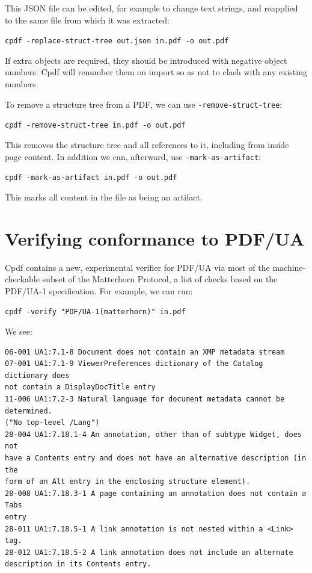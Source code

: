 \documentclass{book}
\begin{document}
This JSON file can be edited, for example to change text strings, and reapplied to the same file from which it was extracted:

  \begin{framed}
    \noindent\small\verb!cpdf -replace-struct-tree out.json in.pdf -o out.pdf!
  \end{framed}

\noindent If extra objects are required, they should be introduced with negative object numbers: Cpdf will renumber them on import so as not to clash with any existing numbers.

To remove a structure tree from a PDF, we can use \texttt{-remove-struct-tree}:

  \begin{framed}
    \noindent\small\verb!cpdf -remove-struct-tree in.pdf -o out.pdf!
  \end{framed}

\noindent This removes the structure tree and all references to it, including from inside page content. In addition we can, afterward, use \texttt{-mark-as-artifact}:

  \begin{framed}
    \noindent\small\verb!cpdf -mark-as-artifact in.pdf -o out.pdf!
  \end{framed}

\noindent This marks all content in the file as being an artifact.

\section{Verifying conformance to PDF/UA}

Cpdf contains a new, experimental verifier for PDF/UA via most of the machine-checkable subset of the Matterhorn Protocol, a list of checks based on the PDF/UA-1 specification. For example, we can run:

  \begin{framed}
    \noindent\small\verb!cpdf -verify "PDF/UA-1(matterhorn)" in.pdf!
  \end{framed}

\noindent We see:

{\small\begin{verbatim}
06-001 UA1:7.1-8 Document does not contain an XMP metadata stream 
07-001 UA1:7.1-9 ViewerPreferences dictionary of the Catalog dictionary does
not contain a DisplayDocTitle entry 
11-006 UA1:7.2-3 Natural language for document metadata cannot be determined.
("No top-level /Lang")
28-004 UA1:7.18.1-4 An annotation, other than of subtype Widget, does not
have a Contents entry and does not have an alternative description (in the
form of an Alt entry in the enclosing structure element). 
28-008 UA1:7.18.3-1 A page containing an annotation does not contain a Tabs
entry 
28-011 UA1:7.18.5-1 A link annotation is not nested within a <Link> tag. 
28-012 UA1:7.18.5-2 A link annotation does not include an alternate
description in its Contents entry. 
\end{verbatim}}
\end{document}
